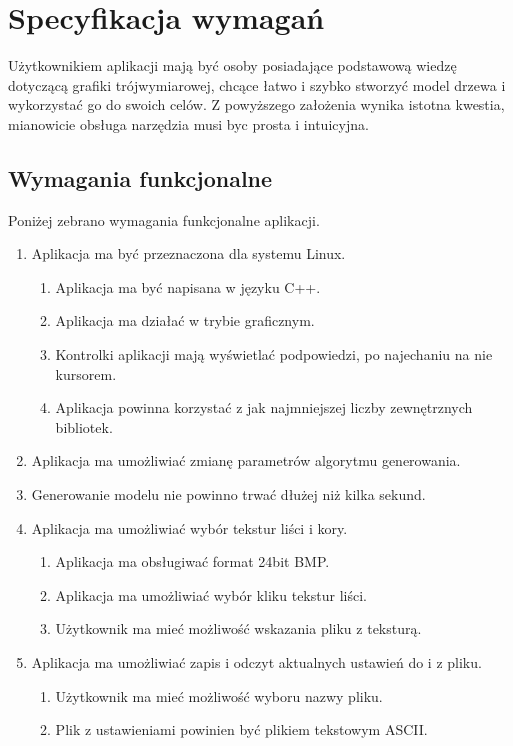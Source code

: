 \chapter{Specyfikacja wymagań}
Użytkownikiem aplikacji mają być osoby posiadające podstawową wiedzę dotyczącą grafiki trójwymiarowej,
chcące łatwo i szybko stworzyć model drzewa i wykorzystać go do swoich celów. Z powyższego założenia
wynika istotna kwestia, mianowicie obsługa narzędzia musi byc prosta i intuicyjna. \\

\section{Wymagania funkcjonalne} 
Poniżej zebrano wymagania funkcjonalne aplikacji.
\begin{enumerate}
\item Aplikacja ma być przeznaczona dla systemu Linux. 
\begin{enumerate}
\item Aplikacja ma być napisana w języku C++.
\item Aplikacja ma działać w trybie graficznym.
\item Kontrolki aplikacji mają wyświetlać podpowiedzi, po najechaniu na nie kursorem.
\item Aplikacja powinna korzystać z jak najmniejszej liczby zewnętrznych bibliotek.
\end{enumerate}
\item Aplikacja ma umożliwiać zmianę parametrów algorytmu generowania.
\item Generowanie modelu nie powinno trwać dłużej niż kilka sekund.
\item Aplikacja ma umożliwiać wybór tekstur liści i kory.
\begin{enumerate}
\item Aplikacja ma obsługiwać format 24bit BMP. 
\item Aplikacja ma umożliwiać wybór kliku tekstur liści.
\item Użytkownik ma mieć możliwość wskazania pliku z teksturą.
\end{enumerate}
\item  Aplikacja ma umożliwiać zapis i odczyt aktualnych ustawień do i z pliku.
\begin{enumerate}
\item Użytkownik ma mieć możliwość wyboru nazwy pliku.
\item Plik z ustawieniami powinien być plikiem tekstowym ASCII.
\end{enumerate}

\end{enumerate}
